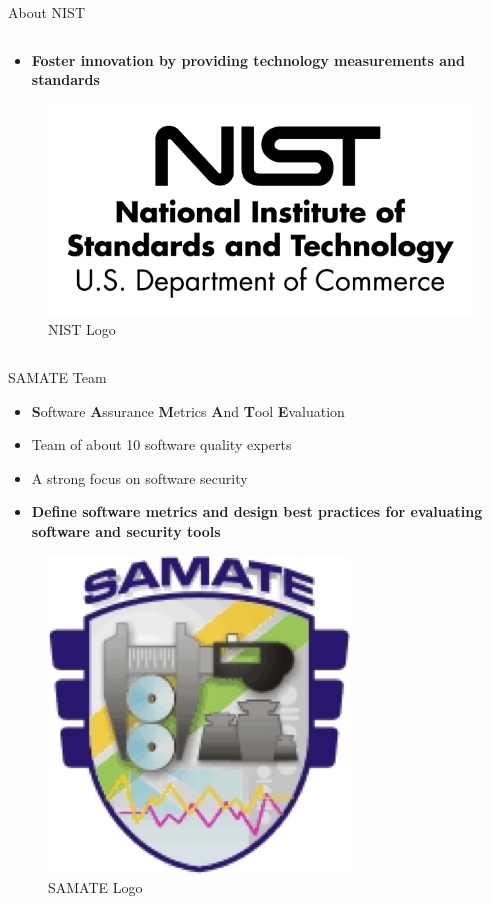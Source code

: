 \documentclass[aspectratio=169]{beamer}
\begin{document}
\begin{frame}{About NIST}
\begin{columns}[t]
\begin{column}{0.71\textwidth}
\begin{small}
\begin{itemize}
        \item \textbf{Foster innovation by providing technology measurements and standards}
        \end{itemize}
        \end{small}
        \begin{figure}
          \centering
          \includegraphics[scale=0.14]{figures/nist-logo}
          \caption{NIST Logo}
        \end{figure}
      \end{column}
    \end{columns}
  \end{frame}

  \begin{frame}{SAMATE Team}
    \begin{itemize}
    \setlength\itemsep{0.7em}
    \item \textbf{S}oftware \textbf{A}ssurance \textbf{M}etrics \textbf{A}nd \textbf{T}ool \textbf{E}valuation
    \item Team of \alert{about 10} software quality experts
    \item A strong focus on software security
    \item \textbf{Define software metrics and design best practices for evaluating software and security tools}
    \end{itemize}
    \begin{figure}
      \centering
      \includegraphics[scale=0.4]{figures/samate-logo}
      \caption{SAMATE Logo}
    \end{figure}
  \end{frame}
\end{document}

